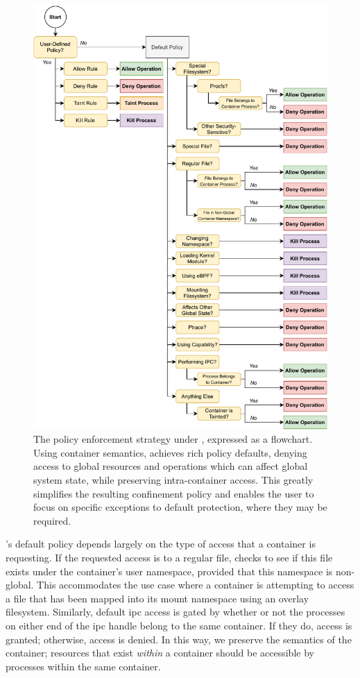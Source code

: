 \begin{figure}[p]
  \centering
  \includegraphics[width=0.8\linewidth]{figs/bpfcontain/enforcement.pdf}
  \caption[The policy enforcement strategy under \bpfcontain{}]{
    The policy enforcement strategy under \bpfcontain{}, expressed as a flowchart. Using
    container semantics, \bpfcontain{} achieves rich policy defaults, denying access to
    global resources and operations which can affect global system state, while preserving
    intra-container access. This greatly simplifies the resulting confinement policy and
    enables the user to focus on specific exceptions to default protection, where they may
    be required.
  }%
  \label{fig:bpfcontain-enforcement}
\end{figure}

\bpfcontain{}'s default policy depends largely on the type of access that a container is
requesting. If the requested access is to a regular file, \bpfcontain{} checks to see if
this file exists under the container's user namespace, provided that this namespace is
non-global. This accommodates the use case where a container is attempting to access
a file that has been mapped into its mount namespace using an overlay filesystem.
Similarly, default \gls{ipc} access is gated by whether or not the processes on either end
of the \gls{ipc} handle belong to the same container. If they do, access is granted;
otherwise, access is denied. In this way, we preserve the semantics of the container;
resources that exist \textit{within} a container should be accessible by processes within
the same container.

